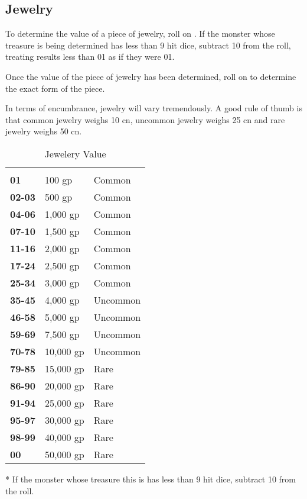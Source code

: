 \begin{multicols*}{2}
\subsection{Jewelry}
To determine the value of a piece of jewelry, roll on . If the monster whose treasure is being determined has less than 9 hit dice, subtract 10 from the roll, treating results less than 01 as if they were 01.

Once the value of the piece of jewelry has been determined, roll on  to determine the exact form of the piece.

In terms of encumbrance, jewelry will vary tremendously. A good rule of thumb is that common jewelry weighs 10 cn, uncommon jewelry weighs 25 cn and rare jewelry weighs 50 cn.

\begin {table}[H]
  \caption{Jewelery Value}\label{tab:Jewelery Value}
  \begin{tabularx}{\columnwidth}{>{\bfseries}YYY}
	 &  & \\
	01 & 100 gp & Common\\
	02-03 & 500 gp & Common\\
	04-06 & 1,000 gp & Common\\
	07-10 & 1,500 gp & Common\\
	11-16 & 2,000 gp & Common\\
	17-24 & 2,500 gp & Common\\
	25-34 & 3,000 gp & Common\\
	35-45 & 4,000 gp & Uncommon\\
	46-58 & 5,000 gp & Uncommon\\
	59-69 & 7,500 gp & Uncommon\\
	70-78 & 10,000 gp & Uncommon\\
	79-85 & 15,000 gp & Rare\\
	86-90 & 20,000 gp & Rare\\
	91-94 & 25,000 gp & Rare\\
	95-97 & 30,000 gp & Rare\\
	98-99 & 40,000 gp & Rare\\
	00 & 50,000 gp & Rare\
  \end {tabularx}
	* If the monster whose treasure this is has less than 9 hit dice, subtract 10 from the roll.
\end {table}


\end{multicols*}
